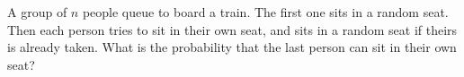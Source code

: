 A group of $n$ people queue to board a train. The first one sits in a random seat. Then each person tries to sit in their own seat, and sits in a random seat if theirs is already taken. What is the probability that the last person can sit in their own seat?
